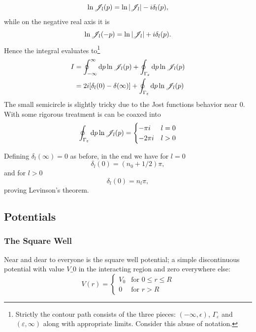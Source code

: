 \begin{equation*}
  \ln\mathscr{J}_{l}(p) = \ln|\mathscr{J}_{l}| - i\delta_{l}(p),
\end{equation*}
while on the negative real axis it is
\begin{equation*}
  \ln\mathscr{J}_{l}(-p) = \ln|\mathscr{J}_{l}| + i\delta_{l}(p).
\end{equation*}
Hence the integral evaluates to\footnote{Strictly the contour path consists of the
  three pieces: \((-\infty, \epsilon)\), \(\Gamma_{\varepsilon}\) and
  \((\varepsilon, \infty)\) along with appropriate limits. Consider this abuse
  of notation.}
\begin{align*}
  I &= \oint_{-\infty}^{\infty} \dd p \ln\mathscr{J}_{l}(p) + \oint_{\Gamma_{\varepsilon}}\dd p \ln\mathscr{J}_{l}(p)\\
  &= 2i[\delta_{l}(0)-\delta(\infty)] + \oint_{\Gamma_{\varepsilon}}\dd p \ln\mathscr{J}_{l}(p)\\
\end{align*}
The small semicircle is slightly tricky due to the Jost functions behavior near
\(0\). With some rigorous treatment is can be coaxed into\cite[p.~234]{taylor}
\begin{equation*}
  \oint_{\Gamma_{\varepsilon}}\dd p \ln\mathscr{J}_{l}(p) =
  \begin{cases}
    -\pi i & l=0\\
    -2\pi i & l > 0
  \end{cases}
\end{equation*}

Defining \(\delta_{l}(\infty)=0\) as before, in the end we have for \(l=0\)
\begin{equation*}
  \delta_{l}(0)= (n_{0}+1/2)\pi,
\end{equation*}
and for \(l>0\)
\begin{equation*}
  \delta_{l}(0)  = n_{l}\pi,
\end{equation*}
proving Levinson's theorem.

\subsection{Potentials}
\subsubsection{The Square Well}
Near and dear to everyone is the square well potential; a simple discontinuous
potential with value \(V\_{0}\) in the interacting region and zero everywhere
else:
\begin{equation*}
  V(r) =
  \begin{cases}
    V_{0} & \text{for } 0 \leq r \leq R\\
    0 & \text{for } r > R 
  \end{cases}
\end{equation*}

